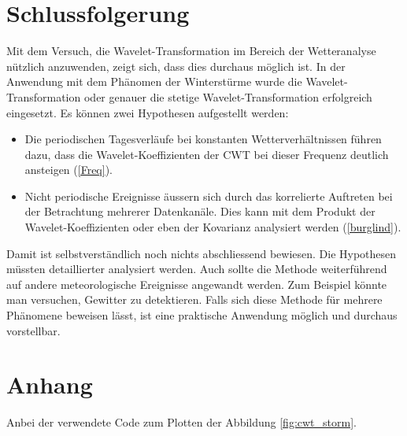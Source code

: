 \begin{refsection}
\section{Schlussfolgerung}

Mit dem Versuch, die Wavelet-Transformation im Bereich der Wetteranalyse nützlich anzuwenden, zeigt sich, dass dies durchaus möglich ist.
In der Anwendung mit dem Phänomen der Winterstürme wurde die Wavelet-Transformation oder genauer die stetige Wavelet-Transformation erfolgreich eingesetzt.
Es können zwei Hypothesen aufgestellt werden:
\begin{itemize}
	\item Die periodischen Tagesverläufe bei konstanten Wetterverhältnissen führen dazu, dass die Wavelet-Koeffizienten der CWT bei dieser Frequenz deutlich ansteigen (\ref{Freq}).
	
	\item Nicht periodische Ereignisse äussern sich durch das korrelierte Auftreten bei der Betrachtung mehrerer Datenkanäle. Dies kann mit dem Produkt der Wavelet-Koeffizienten oder eben der Kovarianz analysiert werden (\ref{burglind}).
\end{itemize}


Damit ist selbstverständlich noch nichts abschliessend bewiesen. Die Hypothesen müssten detaillierter analysiert werden.
Auch sollte die Methode weiterführend auf andere meteorologische Ereignisse angewandt werden.
Zum Beispiel könnte man versuchen, Gewitter zu detektieren.
Falls sich diese Methode für mehrere Phänomene beweisen lässt, ist eine praktische Anwendung möglich und durchaus vorstellbar. 

\section{Anhang}
Anbei
der verwendete Code zum Plotten der Abbildung \ref{fig:cwt_storm}.



%	
%	
 

\printbibliography[heading=subbibliography]
\end{refsection}
